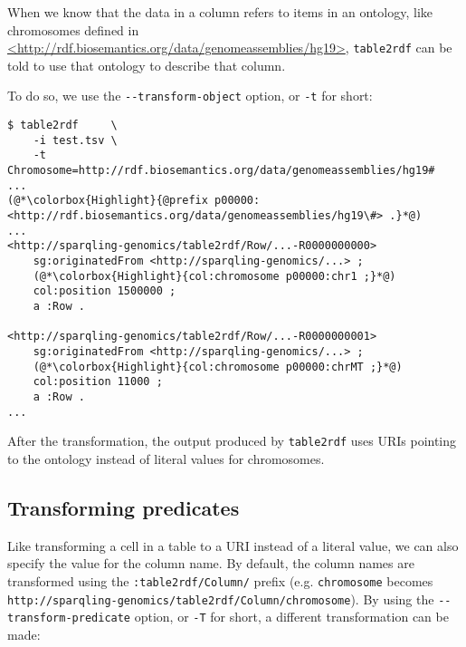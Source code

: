   \begin{sloppypar}
  When we know that the data in a column refers to items in an ontology, like
  chromosomes defined in
  \href{http://rdf.biosemantics.org/data/genomeassemblies/hg19}%
  {<http://rdf.biosemantics.org/data/genomeassemblies/hg19>}, \texttt{table2rdf}
  can be told to use that ontology to describe that column.
  \end{sloppypar}

  To do so, we use the \texttt{-{}-transform-object} option, or \texttt{-t}
  for short:

\begin{siderules}
\begin{lstlisting}
$ table2rdf     \
    -i test.tsv \
    -t Chromosome=http://rdf.biosemantics.org/data/genomeassemblies/hg19#
...
(@*\colorbox{Highlight}{@prefix p00000: <http://rdf.biosemantics.org/data/genomeassemblies/hg19\#> .}*@)
...
<http://sparqling-genomics/table2rdf/Row/...-R0000000000>
    sg:originatedFrom <http://sparqling-genomics/...> ;
    (@*\colorbox{Highlight}{col:chromosome p00000:chr1 ;}*@)
    col:position 1500000 ;
    a :Row .

<http://sparqling-genomics/table2rdf/Row/...-R0000000001>
    sg:originatedFrom <http://sparqling-genomics/...> ;
    (@*\colorbox{Highlight}{col:chromosome p00000:chrMT ;}*@)
    col:position 11000 ;
    a :Row .
...
\end{lstlisting}
\end{siderules}

  After the transformation, the output produced by \texttt{table2rdf} uses
  URIs pointing to the ontology instead of literal values for chromosomes.

\subsection{Transforming predicates}

  Like transforming a cell in a table to a URI instead of a literal value,
  we can also specify the value for the column name.  By default, the column
  names are transformed using the \texttt{:table2rdf/Column/} prefix (e.g.
  \texttt{chromosome} becomes
  \texttt{http://sparqling-genomics/table2rdf/Column/chromosome}).  By using
  the \texttt{-{}-transform-predicate} option, or \texttt{-T} for short, a
  different transformation can be made:

